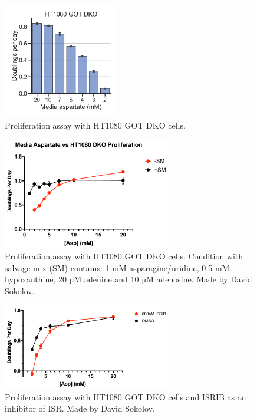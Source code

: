 \begin{figure}[ht]
    \centering
    \includegraphics[width=0.45\textwidth]{figures/sapp/tRNA/HT1080_DKO_asp-titr.pdf}
    \caption[Asp titration in H1080 GOT DKO.]{
    Proliferation assay with HT1080 GOT DKO cells.
    }
    \label{fig:sapp:tRNA:HT1080_DKO_prlfr1}
\end{figure}

\begin{figure}[ht]
    \centering
    \includegraphics[width=0.65\textwidth]{figures/sapp/tRNA/HT1080_GOT-DKO_prlfr.pdf}
    \caption[Asp titration in H1080 GOT DKO.]{
    Proliferation assay with HT1080 GOT DKO cells.
    Condition with salvage mix (SM) contains: 1 mM asparagine/uridine, 0.5 mM hypoxanthine, 20 µM adenine and 10 µM adenosine.
    Made by David Sokolov.
    }
    \label{fig:sapp:tRNA:HT1080_DKO_prlfr2}
\end{figure}

\begin{figure}[ht]
    \centering
    \includegraphics[width=0.65\textwidth]{figures/sapp/ISR/ISRIB-Exp2.pdf}
    \caption[Effect of ISR inhibition on HT1080 GOT DKO.]{
    Proliferation assay with HT1080 GOT DKO cells and ISRIB as an inhibitor of ISR.
    Made by David Sokolov.
    }
    \label{fig:sapp:ISR:HT1080_DKO_ISRIB}
\end{figure}






